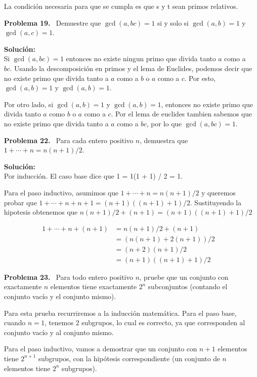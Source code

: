 \documentclass{article}
\newcounter{problem}
\newcounter{solution}
\newcommand\Problem[1]{%
  \stepcounter{problem}%
  \textbf{Problema #1.}~%
  \setcounter{solution}{0}%
}
\newcommand\TheSolution{%
  \textbf{Solución:}\\%
}
\begin{document}
La condición necesaria para que se cumpla es que s y t sean primos relativos.


\Problem{19} Demuestre que $\gcd(a, bc) = 1$ si y solo si $\gcd(a, b) = 1$ y
$\gcd(a, c) = 1$.

\TheSolution{}
Si $\gcd(a, bc) = 1$ entonces no existe ningun primo que divida tanto $a$ como
a $bc$. Usando la descomposición en primos y el lema de Euclides, podemos
decir que no existe primo que divida tanto a $a$ como a $b$ o $a$ como a $c$.
Por esto, $\gcd(a, b) = 1$ y $\gcd(a, b) = 1$.

Por otro lado, si $\gcd(a, b) = 1$ y $\gcd(a, b) = 1$, entonces no existe primo
que divida tanto $a$ como $b$ o $a$ como a $c$. Por el lema de euclides tambien
sabemos que no existe primo que divida tanto a $a$ como a $bc$, por lo que
$\gcd(a, bc) = 1$.

\Problem{22} Para cada entero positivo $n$, demuestra que $1 + \cdots + n = n(n
+ 1) / 2$.

\TheSolution{}
Por inducción. El caso base dice que 1 = 1(1 + 1) / 2 = 1.

Para el paso inductivo, asumimos que $1 + \cdots + n = n(n
+ 1) / 2$ y queremos probar que $1 + \cdots + n + n + 1 = (n + 1)((n + 1) + 1)
/ 2$. Sustituyendo la hipotesis obtenemos que $n(n + 1) / 2 + (n + 1) = (n +
1)((n + 1) + 1) / 2$

\[
  \begin{split}
    1 + \cdots + n + (n + 1) &= n(n + 1) / 2 + (n + 1) \\
                             &= (n(n + 1) + 2(n + 1)) / 2 \\
                             &= (n + 2)(n + 1) / 2 \\
                             &= (n + 1)((n + 1) + 1) / 2
  \end{split}
\]

\Problem{23} Para todo entero positivo $n$, pruebe que un conjunto con
exactamente $n$ elementos tiene exactamente $2^{n}$ subconjuntos (contando el
conjunto vacío y el conjunto mismo).

Para esta prueba recurriremos a la inducci\'on matem\'atica. Para el paso base,
cuando $n=1$, tenemos $2$ subgrupos, lo cual es correcto, ya que corresponden
al conjunto vacío y al conjunto mismo.

Para el paso inductivo, vamos a demostrar que un conjunto con $n+1$ elementos
tiene $2^{n+1}$ subgrupos, con la hip\'otesis correspondiente (un conjunto de
$n$ elementos tiene $2^{n}$ subgrupos).
\end{document}
